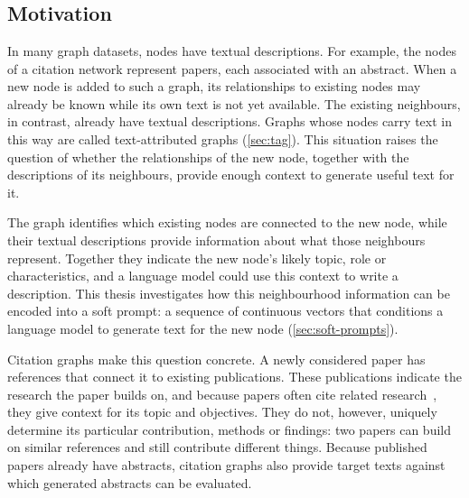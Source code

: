 \chapter{\bevezetes}

\label{chap:introduction}

\section{Motivation}
\label{sec:motivation}

In many graph datasets, nodes have textual descriptions. For example, the nodes of a citation network represent papers, each associated with an abstract. When a new node is added to such a graph, its relationships to existing nodes may already be known while its own text is not yet available. The existing neighbours, in contrast, already have textual descriptions. Graphs whose nodes carry text in this way are called text-attributed graphs (\autoref{sec:tag}). This situation raises the question of whether the relationships of the new node, together with the descriptions of its neighbours, provide enough context to generate useful text for it.

The graph identifies which existing nodes are connected to the new node, while their textual descriptions provide information about what those neighbours represent. Together they indicate the new node's likely topic, role or characteristics, and a language model could use this context to write a description. This thesis investigates how this neighbourhood information can be encoded into a soft prompt: a sequence of continuous vectors that conditions a language model to generate text for the new node (\autoref{sec:soft-prompts}).

Citation graphs make this question concrete. A newly considered paper has references that connect it to existing publications. These publications indicate the research the paper builds on, and because papers often cite related research~\cite{zhu2020beyond}, they give context for its topic and objectives. They do not, however, uniquely determine its particular contribution, methods or findings: two papers can build on similar references and still contribute different things. Because published papers already have abstracts, citation graphs also provide target texts against which generated abstracts can be evaluated.

